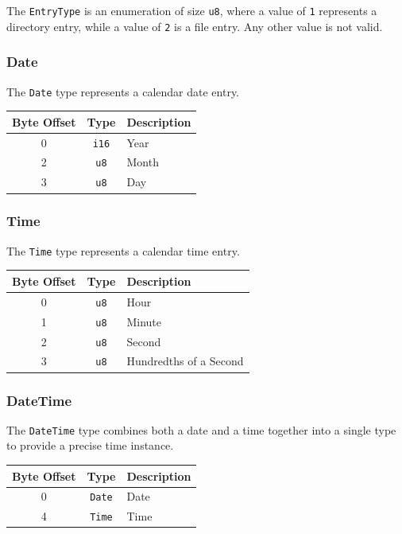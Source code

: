 \documentclass{article}
\begin{document}
The \texttt{EntryType} is an enumeration of size \texttt{u8}, where a value of \texttt{1} represents a directory entry, while a value of \texttt{2} is a file entry. Any other value is not valid.

\subsubsection{Date}

The \texttt{Date} type represents a calendar date entry.

\begin{table}[h!]
    \centering
    \begin{tabular}{cc|l}
        \hline
        Byte Offset & Type & Description \\
        \hline
        0 & \texttt{i16} & Year \\
        2 & \texttt{u8} & Month \\
        3 & \texttt{u8} & Day \\
        \hline
    \end{tabular}
\end{table}

\subsubsection{Time}

The \texttt{Time} type represents a calendar time entry.

\begin{table}[h!]
    \centering
    \begin{tabular}{cc|l}
        \hline
        Byte Offset & Type & Description \\
        \hline
        0 & \texttt{u8} & Hour \\
        1 & \texttt{u8} & Minute \\
        2 & \texttt{u8} & Second \\
        3 & \texttt{u8} & Hundredths of a Second \\
        \hline
    \end{tabular}
\end{table}

\subsubsection{DateTime}

The \texttt{DateTime} type combines both a date and a time together into a single type to provide a precise time instance.
\begin{table}[h!]
    \centering
    \begin{tabular}{cc|l}
        \hline
        Byte Offset & Type & Description \\
        \hline
        0 & \texttt{Date} & Date \\
        4 & \texttt{Time} & Time \\
        \hline
    \end{tabular}
\end{table}
\end{document}
